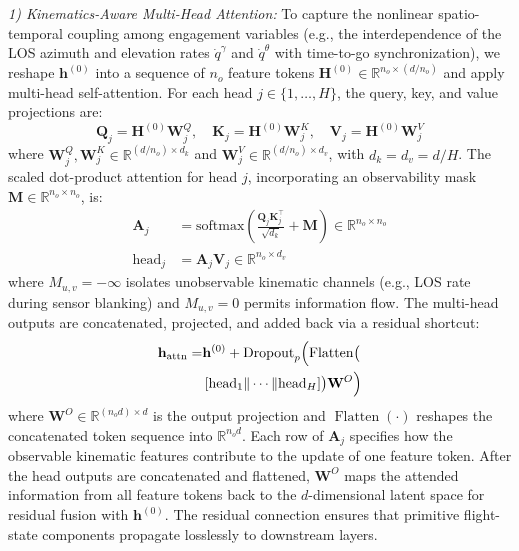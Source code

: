 \documentclass[lettersize,journal]{IEEEtran}
\newcommand{\hladd}[1]{{\color{blue}#1}}
\begin{document}
\emph{1) Kinematics-Aware Multi-Head Attention:} To capture the nonlinear spatio-temporal coupling among engagement variables (e.g., \hladd{the interdependence of the LOS azimuth and elevation rates $\dot{q}^{\gamma}$ and $\dot{q}^{\theta}$ with time-to-go synchronization}), we reshape $\mathbf{h}^{(0)}$ into a sequence of $n_o$ feature tokens $\mathbf{H}^{(0)} \in \mathbb{R}^{n_o \times (d/n_o)}$ and apply multi-head self-attention. For each head $j \in \{1, \dots, H\}$, the query, key, and value projections are:
\begin{equation}
\label{eq:qkv}
\mathbf{Q}_j = \mathbf{H}^{(0)}\mathbf{W}_j^{Q}, \quad \mathbf{K}_j = \mathbf{H}^{(0)}\mathbf{W}_j^{K}, \quad \mathbf{V}_j = \mathbf{H}^{(0)}\mathbf{W}_j^{V}
\end{equation}
where $\mathbf{W}_j^{Q}, \mathbf{W}_j^{K} \in \mathbb{R}^{(d/n_o) \times d_k}$ and $\mathbf{W}_j^{V} \in \mathbb{R}^{(d/n_o) \times d_v}$, with $d_k = d_v = d/H$. The scaled dot-product attention for head $j$, incorporating an observability mask $\mathbf{M} \in \mathbb{R}^{n_o \times n_o}$, is:
\begin{align}
\mathbf{A}_j &= \mathrm{softmax}\!\left(\frac{\mathbf{Q}_j\mathbf{K}_j^\top}{\sqrt{d_k}} + \mathbf{M}\right) \in \mathbb{R}^{n_o \times n_o} \label{eq:attention} \\
\mathrm{head}_j &= \mathbf{A}_j\mathbf{V}_j \in \mathbb{R}^{n_o \times d_v} \nonumber
\end{align}
where $M_{u,v} = -\infty$ isolates unobservable kinematic channels (e.g., LOS rate during sensor blanking) and $M_{u,v} = 0$ permits information flow. The multi-head outputs are concatenated, projected, and added back via a residual shortcut:
\begin{equation}
\label{eq:mha_out}
\begin{split}
\mathbf{h}_{\mathrm{attn}} =& \mathbf{h}^{(0)} + \mathrm{Dropout}_{p}\Bigl(\operatorname{Flatten}\bigl( \\
&\left[\mathrm{head}_1 \| \cdots \| \mathrm{head}_H\right]\bigr) \mathbf{W}^{O}\Bigr)
\end{split}
\end{equation}
where $\mathbf{W}^{O} \in \mathbb{R}^{(n_o d) \times d}$  is the output projection and $\operatorname{Flatten}(\cdot)$ reshapes the concatenated token sequence into $\mathbb{R}^{n_o d}$.
\hladd{Each row of $\mathbf{A}_j$ specifies how the observable
kinematic features contribute to the update of one feature token. After the
head outputs are concatenated and flattened, $\mathbf{W}^{O}$ maps the
attended information from all feature tokens back to the $d$-dimensional
latent space for residual fusion with $\mathbf{h}^{(0)}$.}
The residual connection ensures that primitive flight-state components propagate losslessly to downstream layers.
\end{document}
